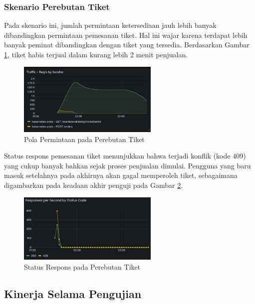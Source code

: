 \pagebreak

\subsubsection{Skenario Perebutan Tiket}

Pada skenario ini, jumlah permintaan ketersediaan jauh lebih banyak dibandingkan permintaan pemesanan tiket. Hal ini wajar karena terdapat lebih banyak peminat dibandingkan dengan tiket yang tersedia. Berdasarkan Gambar \ref{fig:pattern-sim-traffic}, tiket habis terjual dalam kurang lebih 2 menit penjualan.


\begin{figure}[htbp]
    \centering
    \includegraphics[width=0.6\textwidth]{resources/chapter-4/pattern-sim-traffic.png}
    \caption{Pola Permintaan pada Perebutan Tiket}
    \label{fig:pattern-sim-traffic}
\end{figure}

Status respons pemesanan tiket menunjukkan bahwa terjadi konflik (kode 409) yang cukup banyak bahkan sejak proses penjualan dimulai. Pengguna yang baru masuk setelahnya pada akhirnya akan gagal memperoleh tiket, sebagaimana digambarkan pada keadaan akhir penguji pada Gambar \ref{fig:pattern-sim-order}.

\begin{figure}[htbp]
    \centering
    \includegraphics[width=0.6\textwidth]{resources/chapter-4/pattern-sim-order.png}
    \caption{Status Respons pada Perebutan Tiket}
    \label{fig:pattern-sim-order}
\end{figure}


\subsection{Kinerja Selama Pengujian}

